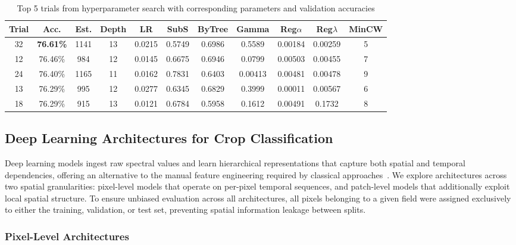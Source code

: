 \documentclass[pdflatex,sn-mathphys]{sn-jnl} %
\begin{document}
\begin{table}[htbp]
\centering
\scriptsize %
\caption{Top 5 trials from hyperparameter search with corresponding parameters and validation accuracies}
\label{tab:top5_trials}
\renewcommand{\arraystretch}{1.1}
\setlength{\tabcolsep}{3pt} %
\begin{tabular}{ccccccccccc}
\toprule
\textbf{Trial} & \textbf{Acc.} & \textbf{Est.} & \textbf{Depth} & \textbf{LR} & \textbf{SubS} & \textbf{ByTree} & \textbf{Gamma} & \textbf{Reg$\alpha$} & \textbf{Reg$\lambda$} & \textbf{MinCW} \\
\midrule
32 & \textbf{76.61\%} & 1141 & 13 & 0.0215 & 0.5749 & 0.6986 & 0.5589 & 0.00184 & 0.00259 & 5 \\
12 & 76.46\% & 984  & 12 & 0.0145 & 0.6675 & 0.6946 & 0.0799 & 0.00503 & 0.00455 & 7 \\
24 & 76.40\% & 1165 & 11 & 0.0162 & 0.7831 & 0.6403 & 0.00413 & 0.00481 & 0.00478 & 9 \\
13 & 76.29\% & 995  & 12 & 0.0277 & 0.6345 & 0.6829 & 0.3999 & 0.00011 & 0.00567 & 6 \\
18 & 76.29\% & 915  & 13 & 0.0121 & 0.6784 & 0.5958 & 0.1612 & 0.00491 & 0.1732 & 8 \\
\bottomrule
\end{tabular}
\end{table}

\subsection{Deep Learning Architectures for Crop Classification}

Deep learning models ingest raw spectral values and learn hierarchical representations
that capture both spatial and temporal dependencies, offering an alternative to the
manual feature engineering required by classical approaches~\cite{maxwell2019,zhu2017,li2019}.
We explore architectures across two spatial granularities: pixel-level models that
operate on per-pixel temporal sequences, and patch-level models that additionally
exploit local spatial structure. To ensure unbiased evaluation across all architectures,
all pixels belonging to a given field were assigned exclusively to either the training,
validation, or test set, preventing spatial information leakage between splits.

\subsubsection{Pixel-Level Architectures}
\end{document}
